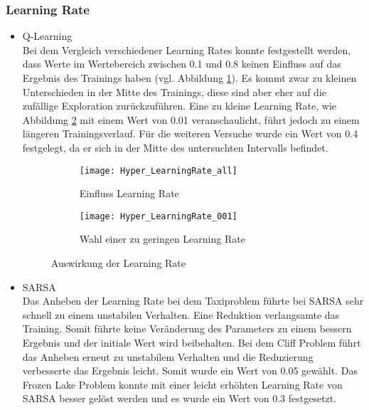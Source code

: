 \subsubsection{Learning Rate}
\begin{itemize}
    \item Q-Learning\\
    Bei dem Vergleich verschiedener Learning Rates konnte festgestellt werden, dass Werte im Wertebereich zwischen 0.1 und 0.8 keinen Einfluss auf das Ergebnis des Trainings haben (vgl. Abbildung \ref{fig:learningRate_all}).
    Es kommt zwar zu kleinen Unterschieden in der Mitte des Trainings, diese sind aber eher auf die zufällige Exploration zurückzuführen.
    Eine zu kleine Learning Rate, wie Abbildung \ref{fig:learningRate_low} mit einem Wert von 0.01 veranschaulicht, führt jedoch zu einem längeren Trainingsverlauf.
    Für die weiteren Versuche wurde ein Wert von 0.4 festgelegt, da er sich in der Mitte des untersuchten Intervalls befindet.

    \begin{figure}[H]
        \centering
        \begin{subfigure}{.5\textwidth}
          \centering
          \texttt{[image: Hyper\_LearningRate\_all]}
          \caption{Einfluss Learning Rate}
          \label{fig:learningRate_all}
        \end{subfigure}%
        \begin{subfigure}{.5\textwidth}
          \centering
          \texttt{[image: Hyper\_LearningRate\_001]}
          \caption{Wahl einer zu geringen Learning Rate}
          \label{fig:learningRate_low}
        \end{subfigure}
        \caption{Auswirkung der Learning Rate}
        \label{fig:learningRate_Q-Learning}
    \end{figure}
    \item SARSA\\
    Das Anheben der Learning Rate bei dem Taxiproblem führte bei SARSA sehr schnell zu einem unstabilen Verhalten. Eine Reduktion verlangsamte das Training.
  	Somit führte keine Veränderung des Parameters zu einem bessern Ergebnis und der initiale Wert wird beibehalten.
    Bei dem Cliff Problem führt das Anheben erneut zu unstabilem Verhalten und die Reduzierung verbesserte das Ergebnis leicht. Somit wurde ein Wert von 0.05 gewählt.
    Das Frozen Lake Problem konnte mit einer leicht erhöhten Learning Rate von SARSA besser gelöst werden und es wurde ein Wert von 0.3 festgesetzt.
\end{itemize}
